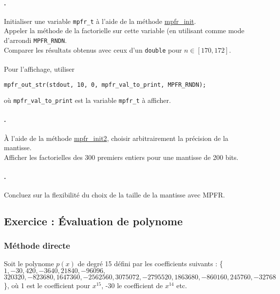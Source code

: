 \documentclass[a4paper,11pt]{exam}
\begin{document}
\paragraph{\theenumii.} 
Initialiser une variable \verb=mpfr_t= à l'aide de la méthode \href{http://www.mpfr.org/mpfr-current/mpfr.html#index-mpfr_005finit}{mpfr\_init}.\\
Appeler la méthode de la factorielle sur cette variable (en utilisant comme mode d'arrondi \verb=MPFR_RNDN=. \\
Comparer les résultats obtenus avec ceux d'un \verb=double= pour $n \in \left[ 170, 172 \right]$.\\ \\
Pour l'affichage, utiliser
\begin{lstlisting}
mpfr_out_str(stdout, 10, 0, mpfr_val_to_print, MPFR_RNDN);
\end{lstlisting} où \verb=mpfr_val_to_print= est la variable \verb=mpfr_t= à afficher.
\paragraph{\theenumii.} 
À l'aide de la méthode \href{http://www.mpfr.org/mpfr-current/mpfr.html#index-mpfr_005finit2}{mpfr\_init2}, choisir arbitrairement la précision de la mantisse.\\
Afficher les factorielles des 300 premiers entiers pour une mantisse de 200 bits.
\paragraph{\theenumii.} 
Concluez sur la flexibilité du choix de la taille de la mantisse avec MPFR.

\newpage
{}
\setcounter{enumii}{1}

\subsection{Exercice \theenumi : Évaluation de polynome}
\subsubsection{Méthode directe}
Soit le polynome $p(x)$ de degré 15 défini par les coefficients suivants : \{ $ 1, -30, 420, -3640, 21840, -96096, $ \\ $ 320320, -823680, 1647360, -2562560, 3075072, -2795520, 1863680, -860160, 245760, -32768 $ \}, où 1 est le coefficient pour $x^{15}$, -30 le coefficient de $x^{14}$ etc. 
\end{document}
